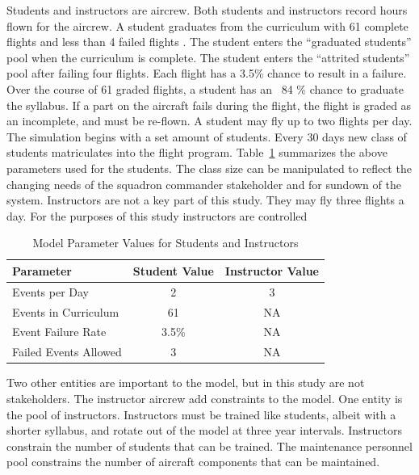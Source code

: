 \documentclass[preprint,12pt]{elsarticle}
\begin{document}
Students and instructors are aircrew. Both
students and instructors record hours flown for the aircrew.  A
student graduates from the curriculum with 61 complete flights and
less than 4 failed 
flights \cite{Air2009}. The student enters the ``graduated students''
pool when the curriculum is complete. The student enters the
``attrited students'' pool after failing four flights. Each flight has
a 3.5\% chance to result in a failure. Over the course of 61 graded
flights, a student has an ~84 \% chance to graduate the syllabus. If a
part on the aircraft fails during the flight, the 
flight is graded as an incomplete, and must be re-flown. A student may
fly up to two flights per day. The simulation begins with a set
amount of students. Every 30 days new class of students
matriculates into the flight program. Table~\ref{t:aircrewParams}
summarizes the above parameters used for the students. The class size
can be manipulated to reflect the changing needs of the squadron
commander stakeholder and for sundown of the system. Instructors are
not a key part of this study. They may fly three flights a
day. For the purposes of this study instructors are controlled

\begin{table}[h]
  \caption{Model Parameter Values for Students and Instructors}
  \label{t:aircrewParams}
  \begin{center}
  \begin{tabular}{l c c}
    \hline
    \hline
    \textbf{Parameter} & \textbf{Student Value} & \textbf{Instructor Value} \\
    \hline
    Events per Day & 2 & 3 \\
    Events in Curriculum & 61 & NA \\
    Event Failure Rate & 3.5\% & NA \\
    Failed Events Allowed & 3 & NA \\
    \hline
  \end{tabular}
  \end{center}
\end{table}

Two other entities are important to the model, but in this study are
not stakeholders. The instructor aircrew  add
constraints to the model. One entity is the pool of
instructors. Instructors must be trained like students, albeit with a
shorter syllabus, and rotate out of the model at three year
intervals. Instructors constrain the number of students that can be
trained. The maintenance personnel pool constrains the number of
aircraft components that can be maintained.
\end{document}
